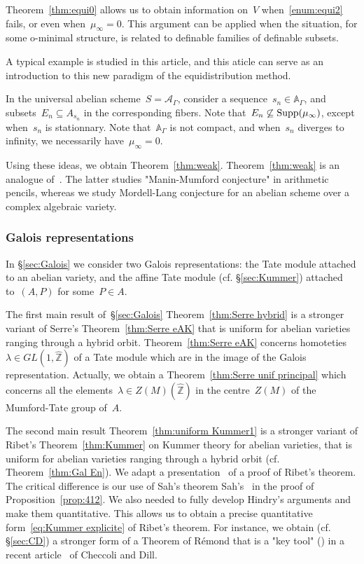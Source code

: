 \documentclass[12pt]{amsart}
\newcommand{\Supp}{{\rm Supp}}
\newcommand{\Z}{{\mathbb Z}}
\newcommand{\A}{{\mathbb A}}
\newcommand{\wh}{\widehat}
\begin{document}
Theorem~\ref{thm:equi0} allows us to obtain information on~$V$ when~\eqref{enum:equi2} fails, or even when~$\mu_\infty=0$. This argument can be applied when the situation, for some o-minimal structure, is related to definable families of definable subsets.

A typical example is studied in this article, and this aticle can serve as an introduction to this new paradigm of the equidistribution method.

In the universal abelian scheme~$S=\mathcal{A}_\Gamma$, consider a sequence~$s_n\in \A_\Gamma$, and subsets~$E_n\subseteq A_{s_n}$ in the corresponding fibers. Note that~$E_n\not\subseteq \Supp(\mu_\infty)$, except when~$s_n$ is stationnary. Note that~$\A_\Gamma$ is not compact, and when~$s_n$ diverges to infinity, we necessarily have~$\mu_\infty=0$.

Using these ideas, we obtain Theorem~\ref{thm:weak}.
Theorem~\ref{thm:weak} is an analogue of~\cite[1.9]{BRU}. The latter studies "Manin-Mumford conjecture" in arithmetic pencils, whereas we study Mordell-Lang conjecture for an abelian scheme over a complex algebraic variety.

\subsubsection{Galois representations}

In \S\ref{sec:Galois} we consider two Galois representations: the Tate module attached to an abelian variety, and the affine Tate module (cf. \S\ref{sec:Kummer}) attached to~$(A,P)$ for some~$P\in A$.

The first main result of~\S\ref{sec:Galois}  Theorem~\ref{thm:Serre hybrid} is a stronger variant of Serre's Theorem~\ref{thm:Serre eAK} that is uniform for abelian varieties ranging through a hybrid orbit. Theorem~\ref{thm:Serre eAK} concerns homoteties~$\lambda\in GL(1,\wh{\Z})$ of a Tate module which are in the image of the Galois representation. 
Actually, we obtain a Theorem~\ref{thm:Serre unif principal}
which concerns all the elements~$\lambda\in Z(M)(\wh{\Z})$ in the centre~$Z(M)$ of the Mumford-Tate group of~$A$.

The second main result Theorem~\ref{thm:uniform Kummer1} is a stronger variant of Ribet's Theorem~\ref{thm:Kummer} on Kummer theory for abelian varieties, that is uniform for abelian varieties ranging through a hybrid orbit (cf. Theorem~\ref{thm:Gal En}). We adapt a presentation~\cite[App. 2]{Hindry} of a proof of Ribet's theorem. The critical difference is our use of Sah's theorem Sah's~\cite[App. 2, Lem.~D]{Hindry} in the proof of Proposition~\ref{prop:412}. We also needed to fully develop Hindry's arguments and make them quantitative. This allows us to obtain a precise quantitative form~\eqref{eq:Kummer explicite} of Ribet's theorem. For instance, we obtain (cf. \S\ref{sec:CD}) a stronger form of a Theorem of Rémond that is a "key tool" (\cite[p. 16]{CD}) in a recent article~\cite{CD} of Checcoli and Dill. 
\end{document}
